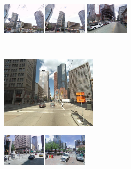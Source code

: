\documentclass[10pt,twocolumn,letterpaper]{article}
\begin{document}
\begin{figure}[t!]
\begin{minipage}{0.75\linewidth}
\begin{minipage}{\linewidth}
                   \colorbox{myRed}{\includegraphics[height=16mm]{imgs/ex1/FV2.jpg}}
                   \colorbox{myRed}{\includegraphics[height=16mm]{imgs/ex1/FV3.jpg}}
                   \colorbox{myRed}{\includegraphics[height=16mm]{imgs/ex1/FV4.jpg}}
               \end{minipage} 
            \end{minipage}
            \\
            \begin{minipage}{0.34\linewidth}
               \centering
               \vspace{0mm}
               \includegraphics[height=36mm]{imgs/ex2/query.jpg}
            \end{minipage}
            \begin{minipage}{0.75\linewidth}
               \begin{minipage}{\linewidth} 
                   \colorbox{myGreen}{\includegraphics[height=16mm]{imgs/ex2/FVsvm1.jpg}}
                   \colorbox{myGreen}{\includegraphics[height=16mm]{imgs/ex2/FVsvm2.jpg}}

\end{minipage}
\end{minipage}
\end{figure}
\end{document}
